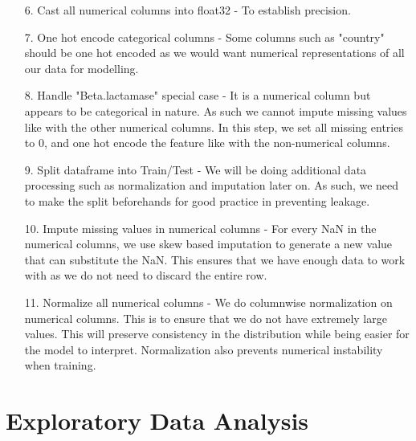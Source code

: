\documentclass[manuscript,screen,review, nonacm]{acmart}
\begin{document}
\begin{itemize}
        \item[6.] Cast all numerical columns into float32 - To establish precision.
        \item[7.] One hot encode categorical columns - Some columns such as "country" should be one hot encoded as we would want
        numerical representations of all our data for modelling.
        \item[8.] Handle "Beta.lactamase" special case - It is a numerical column but appears to be categorical in nature. As such
        we cannot impute missing values like with the other numerical columns. In this step, we set all missing entries to 0, and
        one hot encode the feature like with the non-numerical columns.
        \item[9.] Split dataframe into Train/Test - We will be doing additional data processing such as normalization and imputation later on.
        As such, we need to make the split beforehands for good practice in preventing leakage.
        \item[10.] Impute missing values in numerical columns - For every NaN in the numerical columns, we use skew based imputation to
        generate a new value that can substitute the NaN. This ensures that we have enough data to work with as we do not need to discard the entire row.
        \item[11.] Normalize all numerical columns - We do columnwise normalization on numerical columns. This is to ensure that we do not have extremely
        large values. This will preserve consistency in the distribution while being easier for the model to interpret. Normalization also prevents numerical instability when training.

    \end{itemize}



\section{Exploratory Data Analysis}
\end{document}
